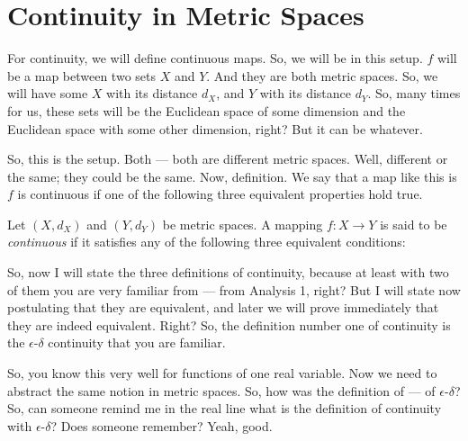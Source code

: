 \section{Continuity in Metric Spaces}

\begin{spoken-clean}[00:03:41 - 00:05:47]
For continuity, we will define continuous maps. So, we will be in this setup. $f$ will be a map between two sets $X$ and $Y$. And they are both metric spaces. So, we will have some $X$ with its distance $d_X$, and $Y$ with its distance $d_Y$. So, many times for us, these sets will be the Euclidean space of some dimension and the Euclidean space with some other dimension, right? But it can be whatever. 

So, this is the setup. Both --- both are different metric spaces. Well, different or the same; they could be the same. Now, definition. We say that a map like this is $f$ is continuous if one of the following three equivalent properties hold true.
\end{spoken-clean}

\begin{math-stroke}
\setcounter{section}{2} \setcounter{subsection}{1} \setcounter{theorem}{51}
\begin{definition}[Continuity]\label{def:continuity}
Let $(X, d_X)$ and $(Y, d_Y)$ be metric spaces. A mapping $f: X \to Y$ is said to be \emph{continuous} if it satisfies any of the following three equivalent conditions:
\end{definition}
\end{math-stroke}

\begin{spoken-clean}[00:05:47 - 00:07:10]
So, now I will state the three definitions of continuity, because at least with two of them you are very familiar from --- from Analysis 1, right? But I will state now postulating that they are equivalent, and later we will prove immediately that they are indeed equivalent. Right? So, the definition number one of continuity is the $\epsilon$-$\delta$ continuity that you are familiar. 

So, you know this very well for functions of one real variable. Now we need to abstract the same notion in metric spaces. So, how was the definition of --- of $\epsilon$-$\delta$? So, can someone remind me in the real line what is the definition of continuity with $\epsilon$-$\delta$? Does someone remember?  Yeah, good. 
\end{spoken-clean}

